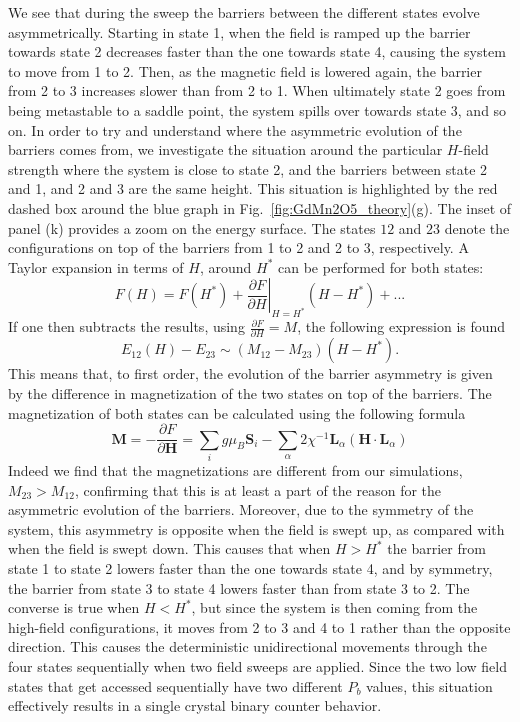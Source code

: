 We see that during the sweep the barriers between the different states evolve asymmetrically.
Starting in state 1, when the field is ramped up the barrier towards state 2 decreases faster than the one towards state 4, causing the system to move from 1 to 2.
Then, as the magnetic field is lowered again, the barrier from 2 to 3 increases slower than from 2 to 1. When ultimately state 2 goes from being metastable to a saddle point, the system spills over towards state 3, and so on.
In order to try and understand where the asymmetric evolution of the barriers comes from, we investigate the situation around the particular $H$-field strength where the system is close to state 2, and the barriers between state 2 and 1, and 2 and 3 are the same height.
This situation is highlighted by the red dashed box around the blue graph in Fig.~\ref{fig:GdMn2O5_theory}(g). The inset of panel (k) provides a zoom on the energy surface. The states $12$ and $23$ denote the configurations on top of the barriers from 1 to 2 and 2 to 3, respectively. A Taylor expansion in terms of $H$, around $H^*$ can be performed for both states:
\begin{equation}
	F(H) = F(H^*) + \left.\frac{\partial F}{\partial H}\right\rvert_{H=H^*} (H-H^*) + ...
\end{equation}
If one then subtracts the results, using $\frac{\partial F}{\partial H} = M$, the following expression is found
\begin{equation}
	E_{12}(H) - E_{23} \sim (M_{12} - M_{23}) (H - H^*).
\end{equation}
This means that, to first order, the evolution of the barrier asymmetry is given by the difference in magnetization of the two states on top of the barriers.
The magnetization of both states can be calculated using the following formula
\begin{equation}
	\mathbf{M} = -\frac{\partial{F}}{\partial{\mathbf{H}}} = \sum_i g \mu_{B} \mathbf{S}_i - \sum_{\alpha} 2 \chi^{-1}\mathbf{L}_{\alpha} (\mathbf{H} \cdot \mathbf{L}_{\alpha}) 
\end{equation}
Indeed we find that the magnetizations are different from our simulations, $M_{23} > M_{12}$, confirming that this is at least a part of the reason for the asymmetric evolution of the barriers.
Moreover, due to the symmetry of the system, this asymmetry is opposite when the field is swept up, as compared with when the field is swept down.
This causes that when $H > H^*$ the barrier from state 1 to state 2 lowers faster than the one towards state 4, and by symmetry, the barrier from state 3 to state 4 lowers faster than from state 3 to 2.
The converse is true when $H < H^*$, but since the system is then coming from the high-field configurations, it moves from 2 to 3 and 4 to 1 rather than the opposite direction.
This causes the deterministic unidirectional movements through the four states sequentially when two field sweeps are applied.
Since the two low field states that get accessed sequentially have two different $P_b$ values, this situation effectively results in a single crystal binary counter behavior.  

